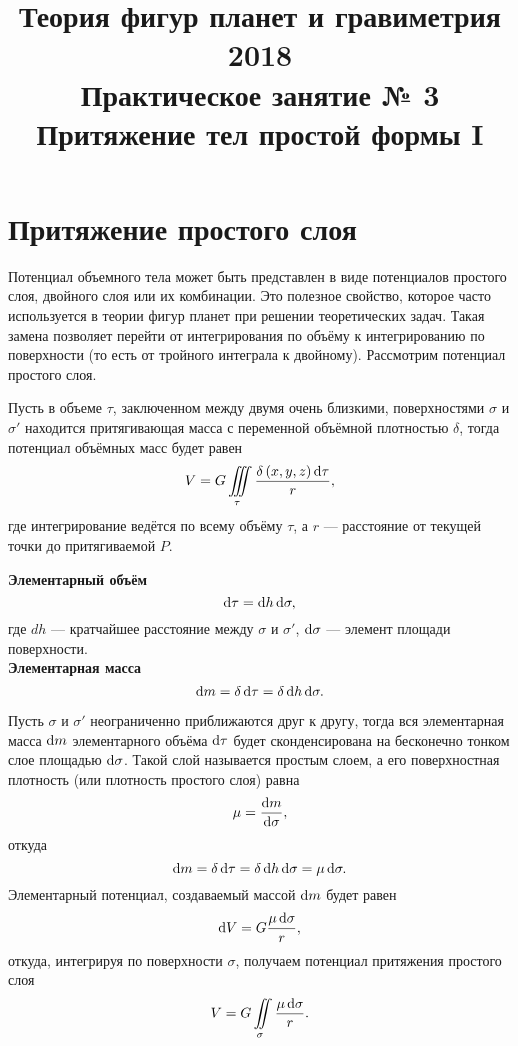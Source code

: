 \documentclass[11pt, a4paper]{article}
\title{{\Large Теория фигур планет и гравиметрия 2018}\\ 
    {\bf\Large Практическое занятие № 3} \\
{\Large Притяжение тел простой формы I}}
\author{}
\date{\DTMusedate{lessondate}}
\theoremstyle{plain}
\theoremstyle{definition}
\theoremstyle{remark}
\begin{document}
\maketitle

\section{Притяжение простого слоя}

Потенциал объемного тела может быть представлен в виде потенциалов простого слоя, двойного слоя или
их комбинации. Это полезное свойство, которое часто используется в теории фигур планет при
решении теоретических задач. Такая замена позволяет перейти от интегрирования по объёму к
интегрированию по поверхности (то есть от тройного интеграла к двойному). Рассмотрим потенциал
простого слоя.

Пусть в объеме $\tau$, заключенном между двумя очень близкими, поверхностями $\sigma$ и $\sigma'$
находится притягивающая масса с переменной объёмной плотностью $\delta$, тогда потенциал объёмных
масс будет равен
\begin{equation*}
    V = G\iiint\limits_{\tau}\dfrac{\delta \left( x, y, z \right)\dif\tau}{r},
\end{equation*}
где интегрирование ведётся по всему объёму $\tau$, а $r$ --- расстояние от текущей 
точки до притягиваемой $P$.

\textbf{Элементарный объём}
\begin{equation*}
    \dif\tau = \dif h\dif\sigma,
\end{equation*}
где $dh$ --- кратчайшее расстояние между $\sigma$ и $\sigma'$,
$\dif\sigma$ --- элемент площади поверхности. \\

\textbf{Элементарная масса}
\begin{equation*}
    \dif m = \delta\dif\tau = \delta\dif h\dif\sigma.
\end{equation*}

Пусть $\sigma$ и $\sigma'$ неограниченно приближаются друг к другу, тогда вся элементарная масса
$\dif m$ элементарного объёма $\dif\tau$ будет сконденсирована на бесконечно тонком слое площадью
$\dif\sigma$. Такой слой называется простым слоем, а его поверхностная плотность (или плотность
простого слоя) равна
\begin{equation*}
    \mu = \dfrac{\dif m }{\dif \sigma},
\end{equation*}
откуда
\begin{equation*}
    \dif m = \delta\dif\tau = \delta\dif h\dif\sigma = \mu\dif\sigma. 
\end{equation*}
Элементарный потенциал, создаваемый массой $\dif m$ будет равен
\begin{equation*}
    \dif V = G\dfrac{\mu\dif\sigma}{r},
\end{equation*}
откуда, интегрируя по поверхности $\sigma$, получаем потенциал притяжения простого слоя
\begin{equation*}
    V = G\iint\limits_{\sigma}\dfrac{\mu\dif\sigma}{r}.
\end{equation*}
\end{document}
